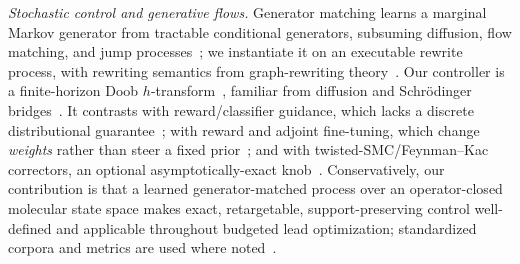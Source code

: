 \emph{Stochastic control and generative flows.} Generator matching learns a marginal Markov generator
from tractable conditional generators, subsuming diffusion, flow matching, and jump
processes~\citep{holderrieth2025generator,lipman2023flow,campbell2024generative,campbell2022continuous,%
lou2024discrete}; we instantiate it on an executable rewrite process, with rewriting semantics from
graph-rewriting theory~\citep{danos2015thermodynamic,behr2021rewriting}. Our controller is a
finite-horizon Doob $h$-transform~\citep{doob1984classical,rogers2000diffusions}, familiar from diffusion
and Schr\"odinger bridges~\citep{zhou2024ddbm,debortoli2021diffusion}. It contrasts with reward/classifier
guidance, which lacks a discrete distributional guarantee~\citep{dhariwal2021diffusion,ho2022classifierfree};
with reward and adjoint fine-tuning, which change \emph{weights} rather than steer a fixed
prior~\citep{black2024ddpo,fan2023dpok,domingoenrich2025adjoint,wang2025drakes,zekri2025sepo}; and with
twisted-SMC/Feynman--Kac correctors, an optional asymptotically-exact knob~\citep{wu2023twisted,%
skreta2025feynman,singhal2025fksteering,delmoral2004feynman,doucet2001smc,du2019implicit}. Conservatively,
our contribution is that a learned generator-matched process over an operator-closed molecular state space
makes exact, retargetable, support-preserving control well-defined and applicable throughout budgeted lead
optimization; standardized corpora and metrics are used where
noted~\citep{brown2019guacamol,gao2022pmo,irwin2012zinc,bickerton2012qed,ertl2009sascore,rogers2010ecfp,%
preuer2018fcd,guo2024saturn,kim2024geneticgfn,loeffler2024reinvent4,guo2024augmentedmemory}.
